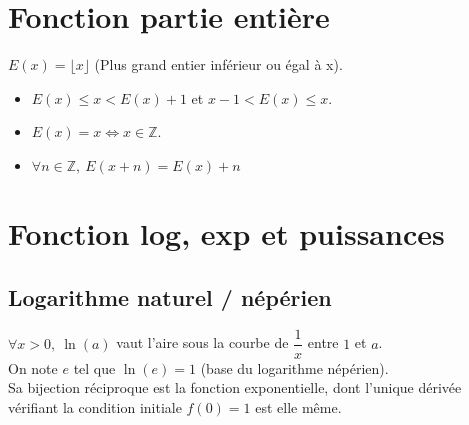   \section{Fonction partie entière}\label{sec:fonction-partie-entiere}

    $E(x) = \lfloor x \rfloor$ (Plus grand entier inférieur ou égal à x).\\

    \begin{itemize}
      \item $E(x) \le x < E(x) + 1$ et $x-1 < E(x) \le x$.
      \item $E(x) = x \Leftrightarrow x \in \mathbb{Z}$.
      \item $\forall n \in \mathbb{Z},\ E(x + n) = E(x) + n$
    \end{itemize}


  \section{Fonction log, exp et puissances}\label{sec:fonction-log-exp-puissances}

    \subsection{Logarithme naturel / népérien}\label{subsec:logarithme-naturel-/-neperien}

      $\forall x > 0,\ \ln(a)$ vaut l'aire sous la courbe de $\dfrac{1}{x}$ entre $1$ et $a$.\\
      On note $e$ tel que $\ln(e) = 1$ (base du logarithme népérien).\\
      Sa bijection réciproque est la fonction exponentielle, dont l'unique dérivée vérifiant la condition initiale $f(0) = 1$ est elle même.\\

      \\


